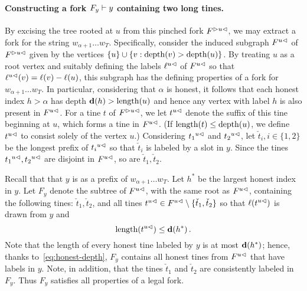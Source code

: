    \paragraph{Constructing a fork $F_y \Fork y$ containing two long tines.}
    By excising the tree rooted at $u$ from this pinched fork
    $\pinch{u}{F}$, we may extract a fork for the string
    $w_{\alpha+1} \dots w_T$. Specifically, consider the induced
    subgraph $\cut{u}{F}$ of $\pinch{u}{F}$ given by the vertices
    $\{u\} \cup \{ v \SuchThat \depth(v) > \depth(u)\}$. By treating $u$ as a
    root vertex and suitably defining the labels $\cut{u}{\ell}$ of
    $\cut{u}{F}$ so that $\cut{u}{\ell}(v) = \ell(v) - \ell(u)$, this
    subgraph has the defining properties of a fork for
    $w_{\alpha+1} \ldots w_T$. In particular, considering that
    $\alpha$ is honest, it follows that each honest index $h > \alpha$
    has depth $\hdepth(h) > \length(u)$ and hence any vertex with label $h$ 
    is also present in $\cut{u}{F}$. 
    For a tine $t$ of $\pinch{u}{F}$, we let $\cut{u}{t}$
    denote the suffix of this tine beginning at $u$, which forms a tine
    in $\cut{u}{F}$. (If $\length(t) \leq \depth(u)$, we define
    $\cut{u}{t}$ to consist solely of the vertex $u$.)  
    Considering $\cut{u}{t_1}$ and $\cut{u}{t_2}$, 
    let $\check{t}_i, i \in \{1, 2\}$ be the longest prefix of $\cut{u}{t_i}$ 
    so that $\check{t}_i$ is labeled by a slot in $y$.
    Since the tines $\cut{u}{t_1}, \cut{u}{t_2}$ are disjoint in $\cut{u}{F}$, 
    so are $\check{t}_1,\check{t}_2$. 
    
    Recall that that $y$ is as a prefix of $w_{\alpha+1} \ldots w_T$.
    Let $h^*$ be the largest honest index in $y$. 
    Let $F_y$ denote the subtree of $\cut{u}{F}$, with the same root as $\cut{u}{F}$, 
    containing the following tines: 
    $\check{t}_1, \check{t}_2$, and 
    all tines $\cut{u}{t} \in \cut{u}{F} \setminus \{\check{t}_1, \check{t}_2\}$ so that 
    $\ell(\cut{u}{t})$ is drawn from $y$ and 
    \begin{equation}\label{eq:tines-Fy}
      \length(\cut{u}{t}) \leq \hdepth(h^*)
      \,.
    \end{equation}
    Note that the length of every honest tine 
    labeled by $y$ is at most $\hdepth(h^*)$; 
    hence, thanks to~\eqref{eq:honest-depth}, 
    $F_y$ contains all honest tines from $\cut{u}{F}$ 
    that have labels in $y$. 
    Note, in addition, that the tines $\check{t}_1$ and $\check{t}_2$ 
    are consistently labeled in $F_y$. 
    Thus $F_y$ satisfies all properties of a legal fork. 
    
